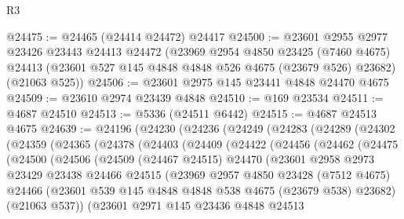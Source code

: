 \begin{lexlean}{R3}
\begin{coremodule}
@24475 := @24465 (@24414 @24472) @24417
@24500 := @23601
    @2955
    @2977
    @23426
    @23443
    @24413
    @24472
    (@23969
      @2954
      @4850
      @23425
      (@7460 @4675)
      @24413
      (@23601 @527 @145 @4848 @4848 @526 @4675 (@23679 @526) @23682)
      (@21063 @525))
@24506 := @23601 @2975 @145 @23441 @4848 @24470 @4675
@24509 := @23610 @2974 @23439 @4848
@24510 := @169 @23534
@24511 := @4687 @24510
@24513 := @5336 (@24511 @6442)
@24515 := @4687 @24513 @4675
@24639 := @24196
    (@24230
      (@24236
        (@24249
          (@24283
            (@24289
              (@24302
                (@24359
                  (@24365
                    (@24378
                      (@24403
                        (@24409
                          (@24422
                            (@24456
                              (@24462
                                (@24475
                                  (@24500
                                    (@24506
                                      (@24509
                                        (@24467 @24515)
                                        @24470
                                        (@23601
                                          @2958
                                          @2973
                                          @23429
                                          @23438
                                          @24466
                                          @24515
                                          (@23969
                                            @2957
                                            @4850
                                            @23428
                                            (@7512 @4675)
                                            @24466
                                            (@23601
                                              @539
                                              @145
                                              @4848
                                              @4848
                                              @538
                                              @4675
                                              (@23679 @538)
                                              @23682)
                                            (@21063 @537))
                                          (@23601
                                            @2971
                                            @145
                                            @23436
                                            @4848
                                            @24513

\end{coremodule}
\end{lexlean}
